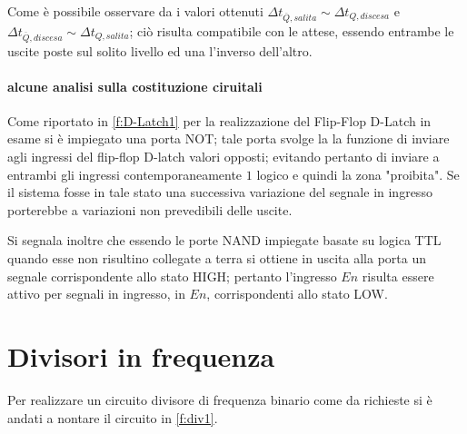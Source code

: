 \documentclass[a4paper,11pt]{article}
\begin{document}
	Come è possibile osservare da i valori ottenuti $\Delta t_{\overline{Q},salita} \sim \Delta t_{{Q},discesa}$ e $\Delta t_{\overline{Q},discesa} \sim \Delta t_{{Q},salita}$; ciò risulta compatibile con le attese, essendo entrambe le uscite poste sul solito livello ed una l'inverso dell'altro.
	\paragraph{alcune analisi sulla costituzione ciruitali }
	Come riportato in \figurename{ \ref{f:D-Latch1}} per la realizzazione del Flip-Flop D-Latch in esame si è impiegato una porta NOT;
	tale porta svolge la la funzione di inviare agli ingressi del flip-flop D-latch valori opposti; evitando pertanto di inviare a entrambi gli ingressi contemporaneamente $1$ logico e quindi la zona "proibita".
	Se il sistema fosse in tale stato una successiva variazione del segnale in ingresso porterebbe a variazioni non prevedibili delle uscite.
	
	Si segnala inoltre che essendo le porte NAND impiegate basate su logica TTL quando esse non risultino collegate a terra si ottiene in uscita alla porta un segnale corrispondente allo stato HIGH; pertanto l'ingresso $En$ risulta essere attivo per
	segnali in ingresso, in $En$, corrispondenti allo stato LOW.
	\section{Divisori in frequenza}
	Per realizzare un circuito divisore di frequenza binario come da richieste si è andati a nontare il circuito in \figurename{ \ref{f:div1}}.
	
\end{document}
